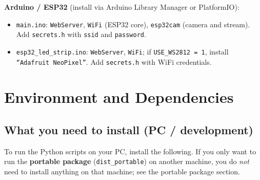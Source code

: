 \documentclass[a4paper,12pt]{article}
\begin{document}
\textbf{Arduino / ESP32} (install via Arduino Library Manager or PlatformIO):
\begin{itemize}
    \item \texttt{main.ino}: \texttt{WebServer}, \texttt{WiFi} (ESP32 core), \texttt{esp32cam} (camera and stream). Add \texttt{secrets.h} with \texttt{ssid} and \texttt{password}.
    \item \texttt{esp32\_led\_strip.ino}: \texttt{WebServer}, \texttt{WiFi}; if \texttt{USE\_WS2812 = 1}, install \texttt{``Adafruit NeoPixel''}. Add \texttt{secrets.h} with WiFi credentials.
\end{itemize}

\section{Environment and Dependencies}

\subsection{What you need to install (PC / development)}
To run the Python scripts on your PC, install the following. If you only want to run the \textbf{portable package} (\texttt{dist\_portable}) on another machine, you do \emph{not} need to install anything on that machine; see the portable package section.
\end{document}
